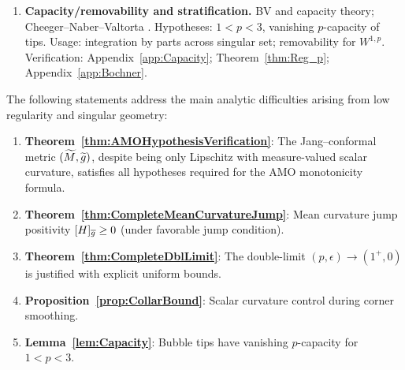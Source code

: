 \begin{enumerate}[(D1)]
    \item \textbf{Capacity/removability and stratification.} BV and capacity theory; Cheeger--Naber--Valtorta \cite{cheegernabervaltorta2015}. Hypotheses: $1<p<3$, vanishing $p$-capacity of tips. Usage: integration by parts across singular set; removability for $W^{1,p}$. Verification: Appendix~\ref{app:Capacity}; Theorem~\ref{thm:Reg_p}; Appendix~\ref{app:Bochner}.
\end{enumerate}

\begin{remark}\label{rem:bottlenecks}
The following statements address the main analytic difficulties arising from low regularity and singular geometry:
\begin{enumerate}
    \item \textbf{Theorem~\ref{thm:AMOHypothesisVerification}}: The Jang--conformal metric $(\widetilde{M}, \widetilde{g})$, despite being only Lipschitz with measure-valued scalar curvature, satisfies all hypotheses required for the AMO monotonicity formula.
    \item \textbf{Theorem~\ref{thm:CompleteMeanCurvatureJump}}: Mean curvature jump positivity $[H]_{\overline{g}} \ge 0$ (under favorable jump condition).
    \item \textbf{Theorem~\ref{thm:CompleteDblLimit}}: The double-limit $(p, \epsilon) \to (1^+, 0)$ is justified with explicit uniform bounds.
    \item \textbf{Proposition~\ref{prop:CollarBound}}: Scalar curvature control during corner smoothing.
    \item \textbf{Lemma~\ref{lem:Capacity}}: Bubble tips have vanishing $p$-capacity for $1 < p < 3$.
\end{enumerate}
\end{remark}

